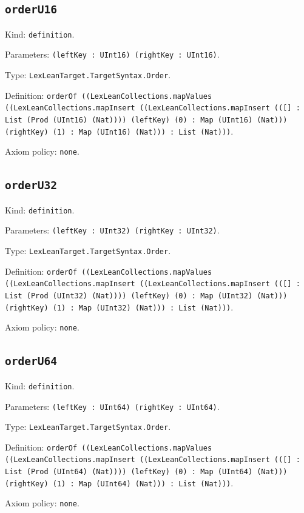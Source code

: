 \documentclass[11pt]{article}
\begin{document}
\subsection*{\texttt{orderU16}}
\noindent Kind: \texttt{definition}.\par
\noindent Parameters: \texttt{(leftKey : UInt16) (rightKey : UInt16)}.\par
\noindent Type: \texttt{LexLeanTarget.TargetSyntax.Order}.\par
\noindent Definition: \texttt{orderOf ((LexLeanCollections.mapValues ((LexLeanCollections.mapInsert ((LexLeanCollections.mapInsert (([] : List (Prod (UInt16) (Nat)))) (leftKey) (0) : Map (UInt16) (Nat))) (rightKey) (1) : Map (UInt16) (Nat))) : List (Nat)))}.\par
\noindent Axiom policy: \texttt{none}.\par
\subsection*{\texttt{orderU32}}
\noindent Kind: \texttt{definition}.\par
\noindent Parameters: \texttt{(leftKey : UInt32) (rightKey : UInt32)}.\par
\noindent Type: \texttt{LexLeanTarget.TargetSyntax.Order}.\par
\noindent Definition: \texttt{orderOf ((LexLeanCollections.mapValues ((LexLeanCollections.mapInsert ((LexLeanCollections.mapInsert (([] : List (Prod (UInt32) (Nat)))) (leftKey) (0) : Map (UInt32) (Nat))) (rightKey) (1) : Map (UInt32) (Nat))) : List (Nat)))}.\par
\noindent Axiom policy: \texttt{none}.\par
\subsection*{\texttt{orderU64}}
\noindent Kind: \texttt{definition}.\par
\noindent Parameters: \texttt{(leftKey : UInt64) (rightKey : UInt64)}.\par
\noindent Type: \texttt{LexLeanTarget.TargetSyntax.Order}.\par
\noindent Definition: \texttt{orderOf ((LexLeanCollections.mapValues ((LexLeanCollections.mapInsert ((LexLeanCollections.mapInsert (([] : List (Prod (UInt64) (Nat)))) (leftKey) (0) : Map (UInt64) (Nat))) (rightKey) (1) : Map (UInt64) (Nat))) : List (Nat)))}.\par
\noindent Axiom policy: \texttt{none}.\par
\end{document}
